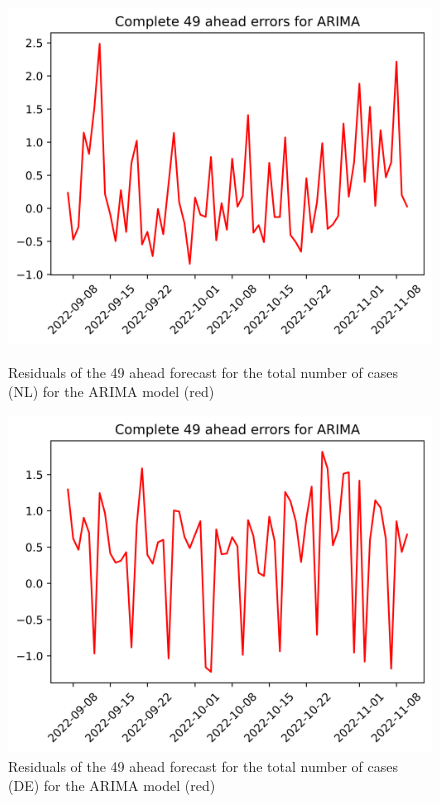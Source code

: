 \begin{figure}

\begin{minipage}{.45\textwidth}
  \centering
  \includegraphics[width=\linewidth]{pics/49_ah/49_ahead_errors_ARIMA.png}
  \caption{Residuals of the 49 ahead forecast for the total number of cases (NL) for the ARIMA model (red)}
  \label{fig:tot_cases_error_49_ARIMA}
\end{minipage}
\begin{minipage}{.45\textwidth}
  \centering
  \includegraphics[width=\linewidth]{pics/49_ah/DE_49_ahead_errors_ARIMA.png}
  \caption{Residuals of the 49 ahead forecast for the total number of cases (DE) for the ARIMA model (red)}
  \label{fig:tot_cases_error_49_ARIMA_DE}
\end{minipage}

\end{figure}
